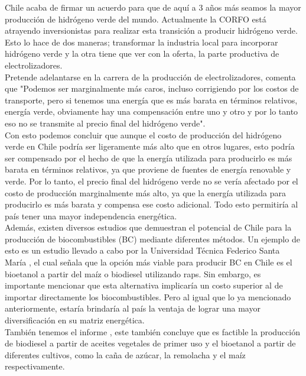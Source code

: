 Chile acaba de firmar un acuerdo para que de aquí a 3 años más seamos la mayor producción de hidrógeno verde del mundo. Actualmente la CORFO está atrayendo inversionistas para realizar esta transición a producir hidrógeno verde. Esto lo hace de dos maneras; transformar la industria local para incorporar hidrógeno verde y la otra tiene que ver con la oferta, la parte productiva de electrolizadores.\\

Pretende adelantarse en la carrera de la producción de electrolizadores, comenta que "Podemos ser marginalmente más caros, incluso corrigiendo por los costos de transporte, pero si tenemos una energía que es más barata en términos relativos, energía verde, obviamente hay una compensación entre uno y otro y por lo tanto eso no se transmite al precio final del hidrógeno verde".\\

Con esto podemos concluir que aunque el costo de producción del hidrógeno verde en Chile podría ser ligeramente más alto que en otros lugares, esto podría ser compensado por el hecho de que la energía utilizada para producirlo es más barata en términos relativos, ya que proviene de fuentes de energía renovable y verde. Por lo tanto, el precio final del hidrógeno verde no se vería afectado por el costo de producción marginalmente más alto, ya que la energía utilizada para producirlo es más barata y compensa ese costo adicional. Todo esto permitiría al país tener una mayor independencia energética.\\

Además, existen diversos estudios que demuestran el potencial de Chile para la producción de biocombustibles (BC) mediante diferentes métodos. Un ejemplo de esto es un estudio llevado a cabo por la Universidad Técnica Federico Santa María , el cual señala que la opción más viable para producir BC en Chile es el bioetanol a partir del maíz o biodiesel utilizando raps. Sin embargo, es importante mencionar que esta alternativa implicaría un costo superior al de importar directamente los biocombustibles. Pero al igual que lo ya mencionado anteriormente, estaría brindaría al país la ventaja de lograr una mayor diversificación en su matriz energética.\\

 También tenemos el informe , este también concluye que es factible la producción de biodiesel  a partir de aceites vegetales de primer uso y el bioetanol a partir de diferentes cultivos, como la caña de azúcar, la remolacha y el maíz respectivamente.\\


